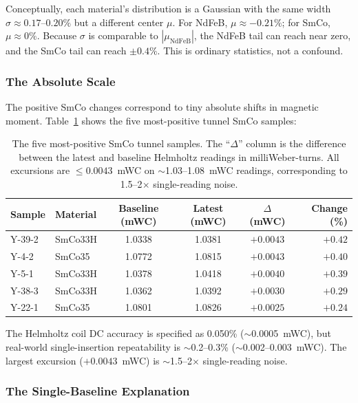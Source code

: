 \documentclass[11pt,letterpaper]{article}
\newcommand{\ndfeb}{NdFeB}
\newcommand{\smco}{SmCo}
\begin{document}
Conceptually, each material's distribution is a Gaussian with the same width
$\sigma \approx 0.17$--$0.20\%$ but a different center $\mu$.  For \ndfeb{},
$\mu \approx -0.21\%$; for \smco{}, $\mu \approx 0\%$.  Because $\sigma$ is
comparable to $|\mu_{\mathrm{NdFeB}}|$, the \ndfeb{} tail can reach near zero,
and the \smco{} tail can reach $\pm 0.4\%$.  This is ordinary statistics, not
a confound.

\subsubsection{The Absolute Scale}

The positive \smco{} changes correspond to tiny absolute shifts in magnetic
moment.  Table~\ref{tab:smco_absolute} shows the five most-positive tunnel
\smco{} samples:

\begin{table}[H]
\centering
\caption{The five most-positive \smco{} tunnel samples.  The ``$\Delta$''
column is the difference between the latest and baseline Helmholtz readings
in milliWeber-turns.  All excursions are $\leq 0.0043$~mWC on
$\sim$1.03--1.08~mWC readings, corresponding to 1.5--2$\times$ single-reading
noise.}
\label{tab:smco_absolute}
\begin{tabular}{@{}llcccr@{}}
\toprule
\textbf{Sample} & \textbf{Material} & \textbf{Baseline (mWC)} & \textbf{Latest (mWC)} & $\Delta$ \textbf{(mWC)} & \textbf{Change (\%)} \\
\midrule
Y-39-2 & SmCo33H & 1.0338 & 1.0381 & $+0.0043$ & $+0.42$ \\
Y-4-2  & SmCo35  & 1.0772 & 1.0815 & $+0.0043$ & $+0.40$ \\
Y-5-1  & SmCo33H & 1.0378 & 1.0418 & $+0.0040$ & $+0.39$ \\
Y-38-3 & SmCo33H & 1.0362 & 1.0392 & $+0.0030$ & $+0.29$ \\
Y-22-1 & SmCo35  & 1.0801 & 1.0826 & $+0.0025$ & $+0.24$ \\
\bottomrule
\end{tabular}
\end{table}

The Helmholtz coil DC accuracy is specified as 0.050\% ($\sim$0.0005~mWC),
but real-world single-insertion repeatability is $\sim$0.2--0.3\%
($\sim$0.002--0.003~mWC).  The largest excursion ($+0.0043$~mWC) is
$\sim$1.5--2$\times$ single-reading noise.

\subsubsection{The Single-Baseline Explanation}
\label{sec:single_baseline}
\end{document}
